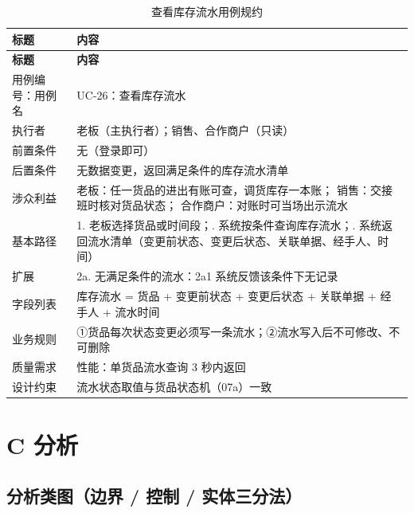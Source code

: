 \documentclass[12pt, a4paper]{ctexart}
\begin{document}
{\small
\begin{longtable}{@{}p{2.4cm} p{12.9cm}@{}}
\caption{查看库存流水用例规约}\label{tab:uc-26}\\
\toprule
\textbf{标题} & \textbf{内容} \\
\midrule
\endfirsthead
\toprule
\textbf{标题} & \textbf{内容} \\
\midrule
\endhead
用例编号：用例名 & UC-26：查看库存流水 \\
\midrule
执行者 & 老板（主执行者）；销售、合作商户（只读） \\
\midrule
前置条件 & 无（登录即可） \\
\midrule
后置条件 & 无数据变更，返回满足条件的库存流水清单 \\
\midrule
涉众利益 & 老板：任一货品的进出有账可查，调货库存一本账；\newline
销售：交接班时核对货品状态；\newline
合作商户：对账时可当场出示流水 \\
\midrule
基本路径 & 1. 老板选择货品或时间段；\newline
2. 系统按条件查询库存流水；\newline
3. 系统返回流水清单（变更前状态、变更后状态、关联单据、经手人、时间） \\
\midrule
扩展 & 2a. 无满足条件的流水：2a1 系统反馈该条件下无记录 \\
\midrule
字段列表 & 库存流水 = 货品 + 变更前状态 + 变更后状态 + 关联单据 + 经手人 + 流水时间 \\
\midrule
业务规则 & ①货品每次状态变更必须写一条流水；\newline ②流水写入后不可修改、不可删除 \\
\midrule
质量需求 & 性能：单货品流水查询 3 秒内返回 \\
\midrule
设计约束 & 流水状态取值与货品状态机（07a）一致 \\
\midrule
\bottomrule
\end{longtable}}


\newpage

\section{C 分析}

\subsection{分析类图（边界 / 控制 / 实体三分法）}
\end{document}
